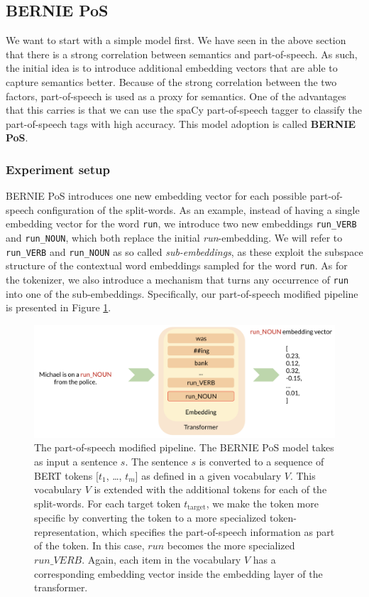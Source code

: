 \documentclass[a4paper,12pt,oneside,openright]{report}
\begin{document}
\subsection{BERNIE PoS} \label{bernie_pos}

We want to start with a simple model first.
We have seen in the above section that there is a strong correlation between semantics and part-of-speech.
As such, the initial idea is to introduce additional embedding vectors that are able to capture semantics better.
Because of the strong correlation between the two factors, part-of-speech is used as a proxy for semantics.
One of the advantages that this carries is that we can use the spaCy part-of-speech tagger \cite{spacyb} to classify the part-of-speech tags with high accuracy. 
This model adoption is called \textbf{BERNIE PoS}.

\subsubsection{Experiment setup}

BERNIE PoS introduces one new embedding vector for each possible part-of-speech configuration of the split-words.
As an example, instead of having a single embedding vector for the word \Verb#run#, we introduce two new embeddings \Verb#run_VERB# and \Verb#run_NOUN#, which both replace the initial \textit{run}-embedding. 
We will refer to \Verb#run_VERB# and \Verb#run_NOUN# as so called \textit{sub-embeddings}, as these exploit the subspace structure of the contextual word embeddings sampled for the word \Verb#run#.
As for the tokenizer, we also introduce a mechanism that turns any occurrence of \Verb#run# into one of the sub-embeddings.
Specifically, our part-of-speech modified pipeline is presented in Figure \ref{fig:BERnie_POS_pipeline}.

\begin{figure}
	\center
  \includegraphics[width=0.8\linewidth]{./assets/experiments/pipeline_tokenizer_BERnie_POS_input.png}
  \caption{The part-of-speech modified pipeline. 
  The BERNIE PoS model takes as input a sentence $s$. The sentence $s$ is converted to a sequence of BERT tokens $[t_1$, \ldots, $t_m]$ as defined in a given vocabulary $V$.
    This vocabulary $V$ is extended with the additional tokens for each of the split-words.
For each target token $t_{\text{target}}$, we make the token more specific by converting the token to a more specialized token-representation, which specifies the part-of-speech information as part of the token.
In this case, $run$ becomes the more specialized $run\_ VERB$.
Again, each item in the vocabulary $V$ has a corresponding embedding vector inside the embedding layer of the transformer.
}
  \label{fig:BERnie_POS_pipeline}
\end{figure}
\end{document}
